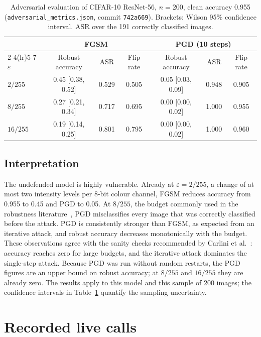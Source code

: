 \begin{table}[htbp]
\centering
\caption{Adversarial evaluation of CIFAR-10 ResNet-56, $n = 200$, clean accuracy 0.955 (\texttt{adversarial\_metrics.json}, commit \texttt{742a669}). Brackets: Wilson 95\% confidence interval. ASR over the 191 correctly classified images.}
\label{tab:adv}
\scriptsize
\begin{tabular}{lcccccc}
\toprule
& \multicolumn{3}{c}{FGSM} & \multicolumn{3}{c}{PGD (10 steps)} \\
\cmidrule(lr){2-4}\cmidrule(lr){5-7}
$\varepsilon$ & Robust accuracy & ASR & Flip rate & Robust accuracy & ASR & Flip rate \\
\midrule
$2/255$ & 0.45 [0.38, 0.52] & 0.529 & 0.505 & 0.05 [0.03, 0.09] & 0.948 & 0.905 \\
$8/255$ & 0.27 [0.21, 0.34] & 0.717 & 0.695 & 0.00 [0.00, 0.02] & 1.000 & 0.955 \\
$16/255$ & 0.19 [0.14, 0.25] & 0.801 & 0.795 & 0.00 [0.00, 0.02] & 1.000 & 0.960 \\
\bottomrule
\end{tabular}
\end{table}

\subsection{Interpretation}

The undefended model is highly vulnerable. Already at $\varepsilon = 2/255$, a change of at most two intensity levels per 8-bit colour channel, FGSM reduces accuracy from 0.955 to 0.45 and PGD to 0.05. At $8/255$, the budget commonly used in the robustness literature~\cite{madry2018towards}, PGD misclassifies every image that was correctly classified before the attack. PGD is consistently stronger than FGSM, as expected from an iterative attack, and robust accuracy decreases monotonically with the budget. These observations agree with the sanity checks recommended by Carlini et al.~\cite{carlini2019evaluating}: accuracy reaches zero for large budgets, and the iterative attack dominates the single-step attack. Because PGD was run without random restarts, the PGD figures are an upper bound on robust accuracy; at $8/255$ and $16/255$ they are already zero. The results apply to this model and this sample of 200 images; the confidence intervals in Table~\ref{tab:adv} quantify the sampling uncertainty.

\section{Recorded live calls}
\label{sec:eval-live}

